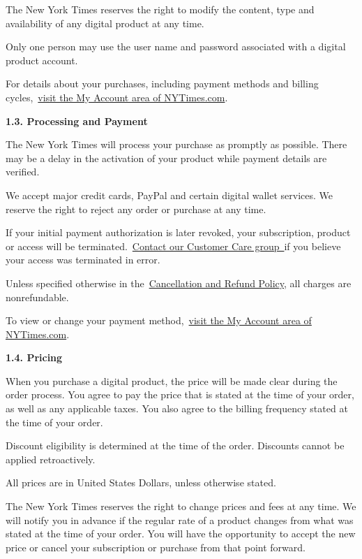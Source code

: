 The New York Times reserves the right to modify the content, type and
availability of any digital product at any time.

Only one person may use the user name and password associated with a
digital product account.

For details about your purchases, including payment methods and billing
cycles,~\href{https://myaccount.nytimes3xbfgragh.onion/membercenter/myaccount.html}{visit
the My Account area of NYTimes.com}.

\textbf{1.3. Processing and Payment}

The New York Times will process your purchase as promptly as possible.
There may be a delay in the activation of your product while payment
details are verified.

We accept major credit cards, PayPal and certain digital wallet
services. We reserve the right to reject any order or purchase at any
time.

If your initial payment authorization is later revoked, your
subscription, product or access will be
terminated.~\href{https://help.nytimes3xbfgragh.onion/hc/en-us/articles/115015385887-Contact-us}{Contact
our Customer Care group~}if you believe your access was terminated in
error.

Unless specified otherwise in
the~\href{https://help.nytimes3xbfgragh.onion/hc/en-us/articles/115014893968-Terms-of-sale\#cancel}{Cancellation
and Refund Policy}, all charges are nonrefundable.

To view or change your payment
method,~\href{https://myaccount.nytimes3xbfgragh.onion/membercenter/myaccount.html}{visit
the My Account area of NYTimes.com}.

\textbf{1.4. Pricing}

When you purchase a digital product, the price will be made clear during
the order process. You agree to pay the price that is stated at the time
of your order, as well as any applicable taxes. You also agree to the
billing frequency stated at the time of your order.

Discount eligibility is determined at the time of the order. Discounts
cannot be applied retroactively.

All prices are in United States Dollars, unless otherwise stated.

The New York Times reserves the right to change prices and fees at any
time. We will notify you in advance if the regular rate of a product
changes from what was stated at the time of your order. You will have
the opportunity to accept the new price or cancel your subscription or
purchase from that point forward.


